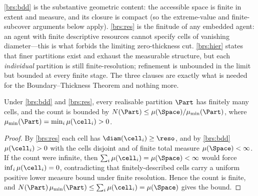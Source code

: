 \begin{remark}
\label{rem:brs-status}
\ref{brs:bdd} is the substantive geometric content: the accessible space is
finite in extent and measure, and its closure is compact (so the
extreme-value and finite-subcover arguments below apply). \ref{brs:res} is the
finitude of any embedded agent: an agent with finite descriptive resources
cannot specify cells of vanishing diameter---this is what forbids the limiting
zero-thickness cut. \ref{brs:hier} states that finer partitions exist and
exhaust the measurable structure, but each \emph{individual} partition is still
finite-resolution; refinement is unbounded in the limit but bounded at every
finite stage. The three clauses are exactly what is needed for the
Boundary--Thickness Theorem and nothing more.
\end{remark}

\begin{lemma}
\label{lem:finite-cells}
Under \ref{brs:bdd} and \ref{brs:res}, every realisable partition $\Part$ has
finitely many cells, and the count is bounded by
$N(\Part)\le \mu(\Space)/\mu_{\min}(\Part)$, where
$\mu_{\min}(\Part)=\min_i\mu(\cell_i)>0$.
\end{lemma}

\begin{proof}
By \ref{brs:res} each cell has $\diam(\cell_i)\ge\reso$, and by
\ref{brs:bdd} $\mu(\cell_i)>0$ with the cells disjoint and of finite total
measure $\mu(\Space)<\infty$. If the count were infinite, then
$\sum_i\mu(\cell_i)=\mu(\Space)<\infty$ would force
$\inf_i\mu(\cell_i)=0$, contradicting that finitely-described cells carry a
uniform positive lower measure bound under finite resolution. Hence the count
is finite, and $N(\Part)\,\mu_{\min}(\Part)\le\sum_i\mu(\cell_i)=\mu(\Space)$
gives the bound.
\end{proof}
